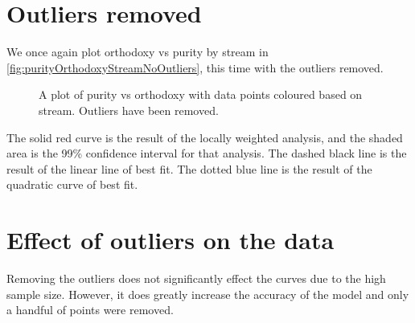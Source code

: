 \section{Outliers removed}
We once again plot orthodoxy vs purity by stream in \vref{fig:purityOrthodoxyStreamNoOutliers}, this time with the outliers removed.
\begin{figure}[H]
	\caption{A plot of purity vs orthodoxy with data points coloured based on stream. Outliers have been removed.}
	\label{fig:purityOrthodoxyStreamNoOutliers}
\end{figure}
The solid red curve is the result of the locally weighted analysis, and the shaded area is the 99\% confidence interval for that analysis.
The dashed black line is the result of the linear line of best fit.
The dotted blue line is the result of the quadratic curve of best fit.

\section{Effect of outliers on the data}
Removing the outliers does not significantly effect the curves due to the high sample size.
However, it does greatly increase the accuracy of the model and only a handful of points were removed.
